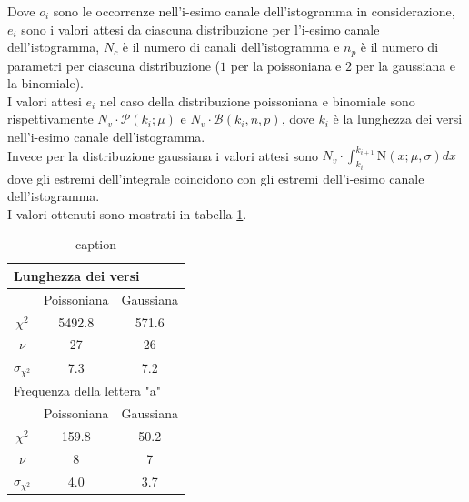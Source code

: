\documentclass[a4paper]{article}
\begin{document}
        Dove $o_i$ sono le occorrenze nell'i-esimo canale dell'istogramma in considerazione,
        $e_i$ sono i valori attesi da ciascuna distribuzione per l'i-esimo canale dell'istogramma,
        $N_c$ è il numero di canali dell'istogramma e $n_p$ è il numero di parametri per ciascuna distribuzione ($1$ per la
        poissoniana e $2$ per la gaussiana e la binomiale).\\
        I valori attesi $e_i$ nel caso della distribuzione poissoniana e binomiale sono
        rispettivamente $N_v \cdot  \mathcal{P}(k_i;\mu)$ e $N_v \cdot  \mathcal{B}(k_i, n, p)$,
        dove $k_i$ è la lunghezza dei versi nell'i-esimo canale dell'istogramma.\\
        Invece per la distribuzione gaussiana i valori attesi sono $N_v \cdot \int_{k_i}^{k_{i+1}} \mathrm{N}(x;\mu,\sigma)dx $
        dove gli estremi dell'integrale coincidono con gli estremi dell'i-esimo canale
        dell'istogramma.\\
        I valori ottenuti sono mostrati in tabella \ref{tab:chi2}.
        \begin{table}[ht!]
            \centering
            \label{tab:chi2}
            \begin{tabular}{c|c||c}
                \multicolumn{3}{l}{Lunghezza dei versi}\\
                \hline
                & Poissoniana & Gaussiana\\
                \hline
                $\chi^2$ & 5492.8 & 571.6\\
                $\nu$ & 27 & 26\\
                $\sigma_{\chi^2}$ & 7.3 & 7.2\\
                \hline\hline
                \multicolumn{3}{l}{Frequenza della lettera "a"}\\
                \hline
                & Poissoniana & Gaussiana\\
                \hline
                $\chi^2$ & 159.8 & 50.2\\
                $\nu$ & 8 & 7\\
                $\sigma_{\chi^2}$ & 4.0 & 3.7
            \end{tabular}
            \caption{caption}
        \end{table}
\end{document}
